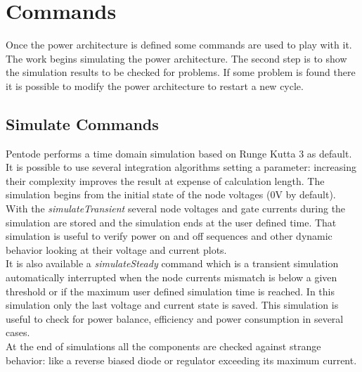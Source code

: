 \documentclass[12pt,a4paper]{book}
\begin{document}
\section{Commands}
Once the power architecture is defined some commands are used to play with it. \\
The work begins simulating the power architecture. The second step is to show the simulation results to be checked for problems. If some problem is found there it is possible to modify the power architecture to restart a new cycle. \\
\subsection{Simulate Commands}
Pentode performs a time domain simulation based on Runge Kutta 3 as default. It is possible to use several integration algorithms setting a parameter: increasing their complexity improves the result at expense of calculation length. The simulation begins from the initial state of the node voltages (0V by default).\\
With the \emph{simulateTransient} several node voltages and gate currents during the simulation are stored and the simulation ends at the user defined time. That simulation is useful to verify power on and off sequences and other dynamic behavior looking at their voltage and current plots.\\
It is also available a \emph{simulateSteady} command which is a transient simulation automatically interrupted when the node currents mismatch is below a given threshold or if the maximum user defined simulation time is reached. In this simulation only the last voltage and current state is saved. This simulation is useful to check for power balance, efficiency and power consumption in several cases. \\
At the end of simulations all the components are checked against strange behavior: like a reverse biased diode or regulator exceeding its maximum current. \\
\end{document}
